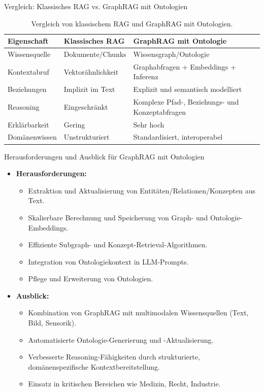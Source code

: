 \documentclass[aspectratio=1610, xcolor=dvipsnames, 9pt]{beamer}
\begin{document}
\begin{frame}{Vergleich: Klassisches RAG vs. GraphRAG mit Ontologien}
  \begin{table}[]
    \centering
    \begin{tabular}{|l|l|l|}
      \hline
      \textbf{Eigenschaft} & \textbf{Klassisches RAG} & \textbf{GraphRAG mit Ontologie} \\ \hline
      Wissensquelle & Dokumente/Chunks & Wissensgraph/Ontologie \\ \hline
      Kontextabruf & Vektorähnlichkeit & Graphabfragen + Embeddings + Inferenz \\ \hline
      Beziehungen & Implizit im Text & Explizit und semantisch modelliert \\ \hline
      Reasoning & Eingeschränkt & Komplexe Pfad-, Beziehungs- und Konzeptabfragen \\ \hline
      Erklärbarkeit & Gering & Sehr hoch \\ \hline
      Domänenwissen & Unstrukturiert & Standardisiert, interoperabel \\ \hline
    \end{tabular}
    \caption{Vergleich von klassischem RAG und GraphRAG mit Ontologien.}
  \end{table}
\end{frame}

\begin{frame}{Herausforderungen und Ausblick für GraphRAG mit Ontologien}
  \begin{itemize}
    \item \textbf{Herausforderungen:}
      \begin{itemize}
        \item Extraktion und Aktualisierung von Entitäten/Relationen/Konzepten aus Text.
        \item Skalierbare Berechnung und Speicherung von Graph- und Ontologie-Embeddings.
        \item Effiziente Subgraph- und Konzept-Retrieval-Algorithmen.
        \item Integration von Ontologiekontext in LLM-Prompts.
        \item Pflege und Erweiterung von Ontologien.
      \end{itemize}
    \item \textbf{Ausblick:}
      \begin{itemize}
        \item Kombination von GraphRAG mit multimodalen Wissensquellen (Text, Bild, Sensorik).
        \item Automatisierte Ontologie-Generierung und -Aktualisierung.
        \item Verbesserte Reasoning-Fähigkeiten durch strukturierte, domänenspezifische Kontextbereitstellung.
        \item Einsatz in kritischen Bereichen wie Medizin, Recht, Industrie.
      \end{itemize}
  \end{itemize}
\end{frame}
\end{document}
